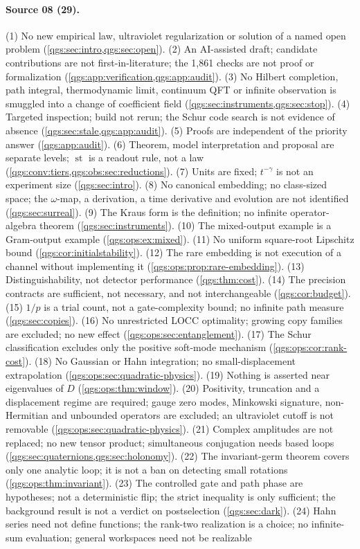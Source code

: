 \documentclass[11pt,oneside]{article}
\numberwithin{equation}{section}
\theoremstyle{plain}
\theoremstyle{definition}
\theoremstyle{remark}
\DeclareMathOperator{\st}{st}
\begin{document}
\paragraph{Source 08 (29).}
(1) No new empirical law, ultraviolet regularization or solution of a named open problem (\cref{qgs:sec:intro,qgs:sec:open}). (2) An AI-assisted draft; candidate contributions are not first-in-literature; the 1,861 checks are not proof or formalization (\cref{qgs:app:verification,qgs:app:audit}). (3) No Hilbert completion, path integral, thermodynamic limit, continuum QFT or infinite observation is smuggled into a change of coefficient field (\cref{qgs:sec:instruments,qgs:sec:stop}). (4) Targeted inspection; build not rerun; the Schur code search is not evidence of absence (\cref{qgs:sec:stale,qgs:app:audit}). (5) Proofs are independent of the priority answer (\cref{qgs:app:audit}). (6) Theorem, model interpretation and proposal are separate levels; $\st$ is a readout rule, not a law (\cref{qgs:conv:tiers,qgs:obs:sec:reductions}). (7) Units are fixed; $t^{-\gamma}$ is not an experiment size (\cref{qgs:sec:intro}). (8) No canonical embedding; no class-sized space; the $\omega$-map, a derivation, a time derivative and evolution are not identified (\cref{qgs:sec:surreal}). (9) The Kraus form is the definition; no infinite operator-algebra theorem (\cref{qgs:sec:instruments}). (10) The mixed-output example is a Gram-output example (\cref{qgs:ops:ex:mixed}). (11) No uniform square-root Lipschitz bound (\cref{qgs:cor:initialstability}). (12) The rare embedding is not execution of a channel without implementing it (\cref{qgs:ops:prop:rare-embedding}). (13) Distinguishability, not detector performance (\cref{qgs:thm:cost}). (14) The precision contracts are sufficient, not necessary, and not interchangeable (\cref{qgs:cor:budget}). (15) $1/p$ is a trial count, not a gate-complexity bound; no infinite path measure (\cref{qgs:sec:copies}). (16) No unrestricted LOCC optimality; growing copy families are excluded; no new effect (\cref{qgs:ops:sec:entanglement}). (17) The Schur classification excludes only the positive soft-mode mechanism (\cref{qgs:ops:cor:rank-cost}). (18) No Gaussian or Hahn integration; no small-displacement extrapolation (\cref{qgs:ops:sec:quadratic-physics}). (19) Nothing is asserted near eigenvalues of $D$ (\cref{qgs:ops:thm:window}). (20) Positivity, truncation and a displacement regime are required; gauge zero modes, Minkowski signature, non-Hermitian and unbounded operators are excluded; an ultraviolet cutoff is not removable (\cref{qgs:ops:sec:quadratic-physics}). (21) Complex amplitudes are not replaced; no new tensor product; simultaneous conjugation needs based loops (\cref{qgs:sec:quaternions,qgs:sec:holonomy}). (22) The invariant-germ theorem covers only one analytic loop; it is not a ban on detecting small rotations (\cref{qgs:ops:thm:invariant}). (23) The controlled gate and path phase are hypotheses; not a deterministic flip; the strict inequality is only sufficient; the background result is not a verdict on postselection (\cref{qgs:sec:dark}). (24) Hahn series need not define functions; the rank-two realization is a choice; no infinite-sum evaluation; general workspaces need not be realizable 
\end{document}
